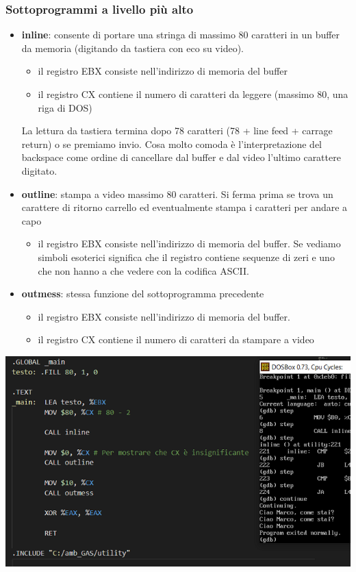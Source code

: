 \documentclass[11pt]{report}
\begin{document}
\subsubsection{Sottoprogrammi a livello più alto}
\begin{itemize}
\item \textbf{inline}: consente di portare una stringa di massimo 80 caratteri in un buffer da memoria (digitando da tastiera con eco su video).
\begin{itemize}
\item il registro EBX consiste nell'indirizzo di memoria del buffer
\item il registro CX contiene il numero di caratteri da leggere (massimo 80, una riga di DOS)
\end{itemize}
La lettura da tastiera termina dopo 78 caratteri (78 + line feed + carrage return) o se premiamo invio. Cosa molto comoda è l'interpretazione del backspace come ordine di cancellare dal buffer e dal video l'ultimo carattere digitato.
\item \textbf{outline}: stampa a video massimo 80 caratteri. Si ferma prima se trova un carattere di ritorno carrello ed eventualmente stampa i caratteri per andare a capo
\begin{itemize}
\item il registro EBX consiste nell'indirizzo di memoria del buffer. Se vediamo simboli esoterici significa che il registro contiene sequenze di zeri e uno che non hanno a che vedere con la codifica ASCII.
\end{itemize}
\item \textbf{outmess}: stessa funzione del sottoprogramma precedente
\begin{itemize}
\item il registro EBX consiste nell'indirizzo di memoria del buffer. 
\item il registro CX contiene il numero di caratteri da stampare a video
\end{itemize}
\end{itemize}
\begin{center}
\includegraphics{img/219.PNG}
\end{center}
\clearpage
\end{document}
